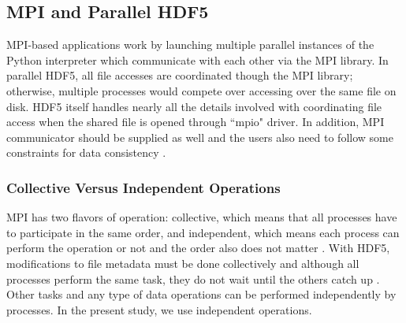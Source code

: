 \subsection{MPI and Parallel HDF5}
MPI-based applications work by launching multiple parallel instances of the Python interpreter which communicate with each other via the MPI library. 
In parallel HDF5, all file accesses are coordinated though the MPI library; otherwise, multiple processes would compete over accessing over the same file on disk. 
HDF5 itself handles nearly all the details involved with coordinating file access when the shared file is opened through ``mpio" driver.
In addition,  MPI communicator should be supplied as well and the users also need to follow some constraints for data consistency \cite{pythonhdf5}.

\subsubsection{Collective Versus Independent Operations} 
MPI has two flavors of operation: collective, which means that all processes have to participate in the same order, and independent, which means each process can perform the operation or not and the order also does not matter  \cite{pythonhdf5}.
With HDF5, modifications to file metadata must be done collectively and although all processes perform the same task, they do not wait until the others catch up \cite{pythonhdf5}. 
Other tasks and any type of data operations can be performed independently by processes.
In the present study, we use independent operations.
